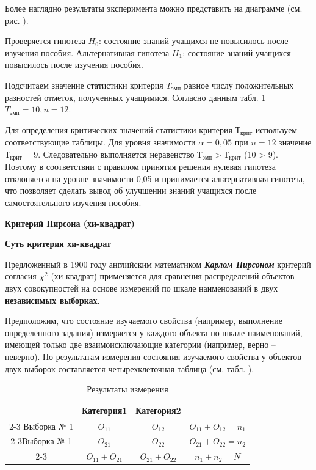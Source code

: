 \documentclass[12pt]{article}
\begin{document}
Более наглядно результаты эксперимента можно представить на диаграмме (см. рис. ).
 
Проверяется гипотеза $H_0$: состояние знаний учащихся не повысилось после изучения пособия. Альтернативная гипотеза $H_1$: состояние знаний учащихся повысилось после изучения пособия.

Подсчитаем значение статистики критерия $T_{эмп}$ равное числу положительных разностей отметок, полученных учащимися. Согласно данным табл. 1 $T_{эмп}=10, n=12$.

Для определения критических значений статистики критерия $Т_{крит}$ используем соответствующие таблицы. Для уровня значимости $\alpha = 0,05$ при $n = 12$ значение $Т_{крит} = 9$. Следовательно выполняется неравенство $Т_{эмп} > Т_{крит}$ (10 > 9). Поэтому в соответствии с правилом принятия решения нулевая гипотеза отклоняется на уровне значимости 0,05 и принимается альтернативная гипотеза, что позволяет сделать вывод об улучшении знаний учащихся после самостоятельного изучения пособия.

\medskip
\textbf{Критерий Пирсона (хи-квадрат)}

\medskip
\textbf{Суть критерия хи-квадрат}

\medskip
Предложенный в 1900 году английским математиком \textbf{\textit{Карлом Пирсоном}} критерий согласия $\chi^2$ (хи-квадрат) применяется для сравнения распределений объектов двух совокупностей на основе измерений по шкале наименований в двух \textbf{независимых выборках}.

\bigskip
Предположим, что состояние изучаемого свойства (например, выполнение определенного задания) измеряется у каждого объекта по шкале наименований, имеющей только две взаимоисключающие категории (например, верно – неверно). По результатам измерения состояния изучаемого свойства у объектов двух выборок составляется четырехклеточная таблица (см. табл. ).

\begin{table}[h]
    \centering
    \caption{Результаты измерения}
    \bigskip
    \begin{tabular}{c|c|c|c} 
         &Категория1&Категория2&  \\
         \cline{2-3} Выборка № 1&\textit{$O_{11}$}&\textit{$O_{12}$}&\textit{$O_{11} + O_{12} = n_1$} \\
         \cline{2-3}Выборка № 1&\textit{$O_{21}$}&\textit{$O_{22}$}&\textit{$O_{21} + O_{22} = n_2$} \\
         \cline{2-3}&\textit{$O_{11} + O_{21}$}&\textit{$O_{21} + O_{22}$}&\textit{$n_1 + n_2 = N$}  \\
    \end{tabular}
\end{table}
 
\end{document}

